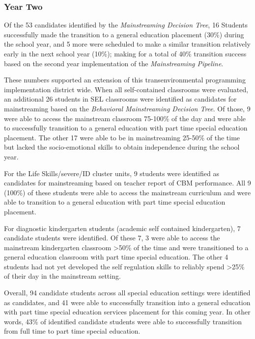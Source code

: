 \documentclass[twoside]{article}
\begin{document}
\subsubsection{Year Two}
Of the 53 candidates identified by the \textit{Mainstreaming Decision Tree}, 16 Students successfully made the transition to a general education placement (30\%) during the school year, and 5 more were scheduled to make a similar transition relatively early in the next school year (10\%); making for a total of 40\% transition success based on the second year  implementation of the \textit{Mainstreaming Pipeline}. 

These numbers supported an extension of this transenvironmental programming implementation district wide. When all self-contained classrooms were evaluated, an additional 26 students in SEL classrooms were identified as candidates for mainstreaming based on the \textit{Behavioral Mainstreaming Decision Tree}. 
Of those, 9 were able to access the mainstream classroom 75-100\% of the day and were able to successfully transition to a general education with part time special education placement. The other 17 were able to be in mainstreaming 25-50\% of the time but lacked the socio-emotional skills to obtain independence during the school year. 

For the Life Skills/severe/ID cluster units, 9 students were identified as candidates for mainstreaming based on teacher report of CBM performance. All 9  (100\%) of these students were able to access the mainstream curriculum and were able to transition to a general education with part time special education placement. 

For diagnostic kindergarten students (academic self contained kindergarten), 7 candidate students were identified. Of these 7, 3 were able to access the mainstream kindergarten classroom >50\% of the time and were transitioned to a general education classroom with part time special education. The other 4 students had not yet developed the self regulation skills to reliably spend \textgreater25\% of their day in the mainstream setting. 

Overall, 94 candidate students across all special education settings were identified as candidates, and 41 were able to successfully transition into a general education with part time special education services placement for this coming year. In other words, 43\% of identified candidate students were able to successfully transition from full time to part time special education. 
\end{document}
